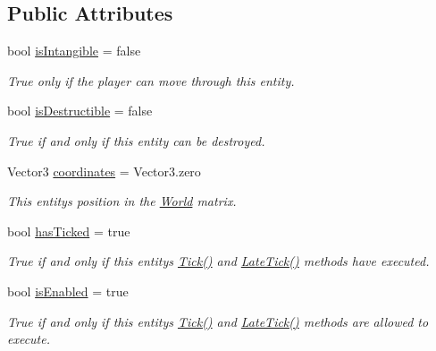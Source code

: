 \subsection*{Public Attributes}
\begin{DoxyCompactItemize}
\item 
bool \mbox{\hyperlink{class_entity_a392e02c7155fc0b9a0fd344b7c01c025}{is\+Intangible}} = false
\begin{DoxyCompactList}\small\item\em True only if the player can move through this entity. \end{DoxyCompactList}\item 
bool \mbox{\hyperlink{class_entity_ae1d1e0c619e8f41d50d948b5f2c2cefd}{is\+Destructible}} = false
\begin{DoxyCompactList}\small\item\em True if and only if this entity can be destroyed. \end{DoxyCompactList}\item 
Vector3 \mbox{\hyperlink{class_entity_af07da28c7ac110de4e22283ffb86380a}{coordinates}} = Vector3.\+zero
\begin{DoxyCompactList}\small\item\em This entity\textquotesingle{}s position in the \mbox{\hyperlink{class_world}{World}} matrix. \end{DoxyCompactList}\item 
bool \mbox{\hyperlink{class_entity_a5c863af2a4933e264e30be69644c749e}{has\+Ticked}} = true
\begin{DoxyCompactList}\small\item\em True if and only if this entity\textquotesingle{}s \mbox{\hyperlink{class_entity_a7a09da64c6d87cd1bce0bb69512d82fc}{Tick()}} and \mbox{\hyperlink{class_entity_a80e2936e1d8d8590dc183b2980fcd3c9}{Late\+Tick()}} methods have executed. \end{DoxyCompactList}\item 
bool \mbox{\hyperlink{class_entity_aafcac2c050f5043481675c18490efe51}{is\+Enabled}} = true
\begin{DoxyCompactList}\small\item\em True if and only if this entity\textquotesingle{}s \mbox{\hyperlink{class_entity_a7a09da64c6d87cd1bce0bb69512d82fc}{Tick()}} and \mbox{\hyperlink{class_entity_a80e2936e1d8d8590dc183b2980fcd3c9}{Late\+Tick()}} methods are allowed to execute. \end{DoxyCompactList}\end{DoxyCompactItemize}
